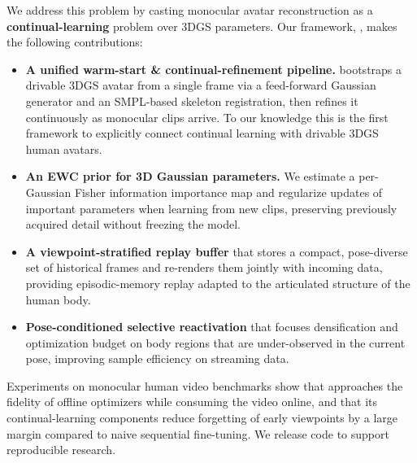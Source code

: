 We address this problem by casting monocular avatar reconstruction as a
\textbf{continual-learning} problem over 3DGS parameters. Our framework,
\method{}, makes the following contributions:

\begin{itemize}
    \item \textbf{A unified warm-start \& continual-refinement pipeline.}
          \method{} bootstraps a drivable 3DGS avatar from a single frame
          via a feed-forward Gaussian generator and an SMPL-based skeleton
          registration, then refines it continuously as monocular clips
          arrive. To our knowledge this is the first framework to
          explicitly connect continual learning with drivable 3DGS human
          avatars.
    \item \textbf{An EWC prior for 3D Gaussian parameters.} We estimate a
          per-Gaussian Fisher information importance map and regularize
          updates of important parameters when learning from new clips,
          preserving previously acquired detail without freezing the model.
    \item \textbf{A viewpoint-stratified replay buffer} that stores a
          compact, pose-diverse set of historical frames and re-renders
          them jointly with incoming data, providing episodic-memory
          replay adapted to the articulated structure of the human body.
    \item \textbf{Pose-conditioned selective reactivation} that focuses
          densification and optimization budget on body regions that are
          under-observed in the current pose, improving sample efficiency
          on streaming data.
\end{itemize}

Experiments on monocular human video benchmarks show that \method{}
approaches the fidelity of offline optimizers while consuming the video
online, and that its continual-learning components reduce forgetting of
early viewpoints by a large margin compared to naive sequential
fine-tuning. We release code to support reproducible research.
